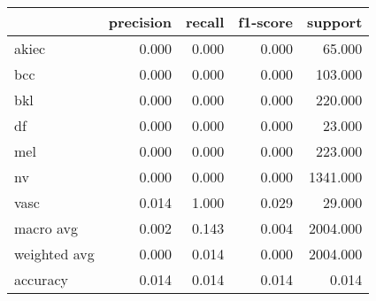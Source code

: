 \begin{tabular}{lrrrr}
\toprule
 & precision & recall & f1-score & support \\
\midrule
akiec & 0.000 & 0.000 & 0.000 & 65.000 \\
bcc & 0.000 & 0.000 & 0.000 & 103.000 \\
bkl & 0.000 & 0.000 & 0.000 & 220.000 \\
df & 0.000 & 0.000 & 0.000 & 23.000 \\
mel & 0.000 & 0.000 & 0.000 & 223.000 \\
nv & 0.000 & 0.000 & 0.000 & 1341.000 \\
vasc & 0.014 & 1.000 & 0.029 & 29.000 \\
macro avg & 0.002 & 0.143 & 0.004 & 2004.000 \\
weighted avg & 0.000 & 0.014 & 0.000 & 2004.000 \\
accuracy & 0.014 & 0.014 & 0.014 & 0.014 \\
\bottomrule
\end{tabular}
